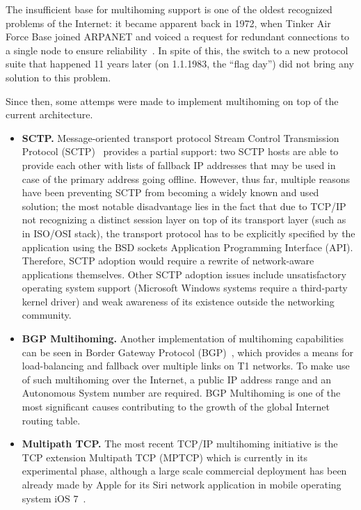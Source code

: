         The insufficient base for multihoming support is one of the oldest recognized problems of the Internet: it became apparent back in 1972, when Tinker Air Force Base joined ARPANET and voiced a request for redundant connections to a single node to ensure reliability~\cite{Patterns}. In spite of this, the switch to a new protocol suite that happened 11 years later (on 1.1.1983, the ``flag day'') did not bring any solution to this problem.

        Since then, some attemps were made to implement multihoming on top of the current architecture.

        \begin{itemize}
            \item \textbf{SCTP.}
            Message-oriented transport protocol Stream Control Transmission Protocol (SCTP)~\cite{rfc4960} provides a partial support: two SCTP hosts are able to provide each other with lists of fallback IP addresses that may be used in case of the primary address going offline. However, thus far, multiple reasons have been preventing SCTP from becoming a widely known and used solution; the most notable disadvantage lies in the fact that due to TCP/IP not recognizing a distinct session layer on top of its transport layer (such as in ISO/OSI stack), the transport protocol has to be explicitly specified by the application using the BSD sockets Application Programming Interface (API). Therefore, SCTP adoption would require a rewrite of network-aware applications themselves. Other SCTP adoption issues include unsatisfactory operating system support (Microsoft Windows systems require a third-party kernel driver) and weak awareness of its existence outside the networking community.

            \item \textbf{BGP Multihoming.} Another implementation of multihoming capabilities can be seen in Border Gateway Protocol (BGP)~\cite{rfc4271}, which provides a means for load-balancing and fallback over multiple links on T1 networks. To make use of such multihoming over the Internet, a public IP address range and an Autonomous System number are required. BGP Multihoming is one of the most significant causes contributing to the growth of the global Internet routing table.

            \item \textbf{Multipath TCP.} The most recent TCP/IP multihoming initiative is the TCP extension Multipath TCP (MPTCP) which is currently in its experimental phase, although a large scale commercial deployment has been already made by Apple for its Siri network application in mobile operating system iOS 7~\cite{Apple_MP}.
        \end{itemize}

